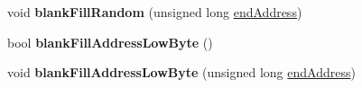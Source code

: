 \begin{DoxyCompactItemize}
\item 
\hypertarget{classintelhex_aa1dbcbf3df1aaafd518882c882f43f76}{void {\bfseries blank\-Fill\-Random} (unsigned long \hyperlink{classintelhex_a9b159bea81eb832e37f6cf88a57ca659}{end\-Address})}\label{classintelhex_aa1dbcbf3df1aaafd518882c882f43f76}

\item 
\hypertarget{classintelhex_a2e5c67fccc34c78e6dbd28f4b795fb0f}{bool {\bfseries blank\-Fill\-Address\-Low\-Byte} ()}\label{classintelhex_a2e5c67fccc34c78e6dbd28f4b795fb0f}

\item 
\hypertarget{classintelhex_ab7b16f457563da93569b9812fafb9e7d}{void {\bfseries blank\-Fill\-Address\-Low\-Byte} (unsigned long \hyperlink{classintelhex_a9b159bea81eb832e37f6cf88a57ca659}{end\-Address})}\label{classintelhex_ab7b16f457563da93569b9812fafb9e7d}


\end{DoxyCompactItemize}
